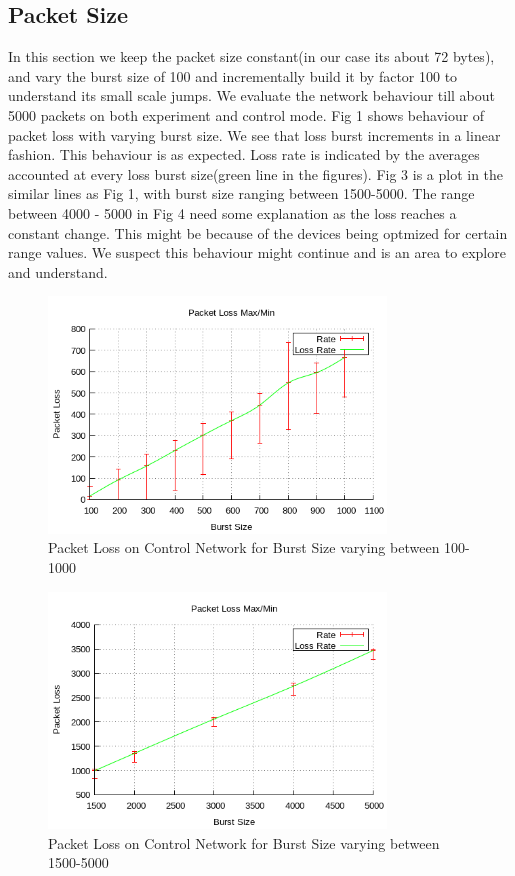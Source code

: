 \documentclass[11pt]{article}
\begin{document}
\subsection{Packet Size} 
In this section we keep the packet size constant(in our case its about 72 bytes), and vary the burst size of 100 and incrementally build it by factor 100 to understand its small scale jumps. We evaluate the network behaviour till about 5000 packets on both experiment and control mode.
Fig 1 shows behaviour of packet loss with varying burst size. We see that loss burst increments in a linear fashion. This behaviour is as expected. Loss rate is indicated by the averages accounted at every loss burst size(green line in the figures). Fig 3 is a plot in the similar lines as Fig 1, with burst size ranging between 1500-5000. The range between 4000 - 5000 in Fig 4 need some explanation as the loss reaches a constant change. This might be because of the devices being optmized for certain range values. We suspect this behaviour might continue and is an area to explore and understand.
\begin{figure}[!ht]
\centering
\includegraphics[width=0.8\textwidth]{Fig1.png}
\caption{Packet Loss on Control Network for Burst Size varying between 100-1000}
\end{figure}
\FloatBarrier
\begin{figure}[!ht]
\centering
\includegraphics[width=0.8\textwidth]{Fig2.png}
\caption{Packet Loss on Control Network for Burst Size varying between 1500-5000}
\end{figure}
\end{document}
